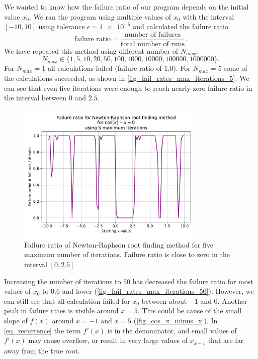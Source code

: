 We wanted to know how the failure ratio of our program depends on the initial value $x_0$. We ran the program using multiple values of $x_0$ with the interval $[-10, 10]$ using tolerance $\epsilon=\num{1e-5}$ and calculated the failure ratio
\[
  \textrm{failure ratio} = \frac{\textrm{number of failures}}{\textrm{total number of runs}}.
\]
We have repeated this method using different number of $N_{max}$:
\[
  N_{max} \in \{1, 5, 10, 20, 50, 100, \num{1000}, \num{10000}, \num{100000}, \num{1000000} \}.
\]
For $N_{max}=1$ all calculations failed (failure ratio of $1.0$). For $N_{max}=5$ some of the calculations succeeded, as shown in \autoref{fig_fail_rates_max_iterations_5}. We can see that even five iterations were enough to reach nearly zero failure ratio in the interval between $0$ and $2.5$.
\begin{figure}[H]
  \centering
  \includegraphics[width=0.8\textwidth]{figures/plot_max_iterations_5.pdf}
  \caption{Failure ratio of Newton-Raphson root finding method for five maximum number of iterations. Failure ratio is close to zero in the interval $[0, 2.5]$}
  \label{fig_fail_rates_max_iterations_5}
\end{figure}
Increasing the number of iterations to $50$ has decreased the failure ratio for most values of $x_0$ to $0.6$ and lower (\autoref{fig_fail_rates_max_iterations_50}). However, we can still see that all calculation failed for $x_0$ between about $-1$ and $0$. Another peak in failure rates is visible around $x=5$. This could be cause of the small slope of $f(x)$ around $x=-1$ and $x=5$ (\autoref{fig_cos_x_minus_x}). In \autoref{eq_recurrence} the term $f'(x)$ is in the denominator, and small values of $f'(x)$ may cause overflow, or result in very large values of $x_{x+1}$ that are far away from the true root.
